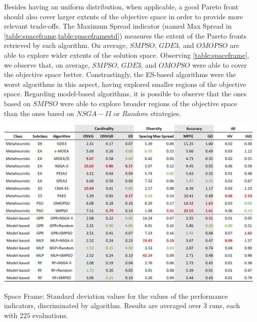 Besides having an uniform distribution, when applicable, a good Pareto front should also cover larger extents of the objective space in order to provide more relevant trade-offs. The Maximum Spread indicator (named Max Spread in \cref{table:spaceframe,table:spaceframestd}) measures the extent of the Pareto fronts retrieved by each algorithm. On average, $SMPSO$, $GDE3$, and $OMOPSO$ are able to explore wider extents of the solution space. Observing \cref{table:spaceframe}, we observe that, on average, $SMPSO$, $GDE3$, and $OMOPSO$ were able to cover the objective space better. Constrastingly, the \ac{ES}-based algorithms were the worst algorithms in this aspect, having explored smaller regions of the objective space. Regarding model-based algorithms, it is possible to observe that the ones based on $SMPSO$ were able to explore broader regions of the objective space than the ones based on $NSGA-II$ or $Random$ strategies. 

\begin{table}[h!]
	\centering
	\includegraphics[width=\textwidth]{Images/Evaluation/caadria/Results_Std_20190416.PNG}
	\caption[Space Frame: Standard deviations of the performance indicators results, discriminated by each algorithm]{Space Frame: Standard deviation values for the values of the performance indicators, discriminated by algorithm. Results are averaged over $3$ runs, each with $225$ evaluations.}
	\label{table:spaceframestd}
\end{table}

